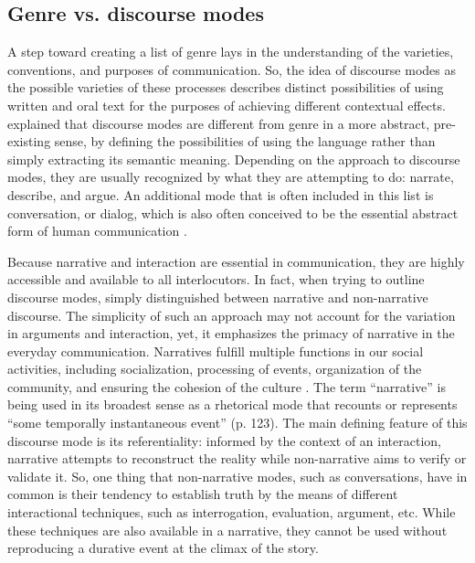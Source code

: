 \documentclass[12pt]{article}
\begin{document}
\subsection{Genre vs. discourse modes}
A step toward creating a list of genre lays in the understanding of the varieties, conventions, and purposes of communication. So, the idea of discourse modes as the possible varieties of these processes describes distinct possibilities of using written and oral text for the purposes of achieving different contextual effects. \textcite[p. 54]{bax2011} explained that discourse modes are different from genre in a more abstract, pre-existing sense, by defining the possibilities of using the language rather than simply extracting its semantic meaning. Depending on the approach to discourse modes, they are usually recognized by what they are attempting to do: narrate, describe, and argue. An additional mode that is often included in this list is conversation, or dialog, which is also often conceived to be the essential abstract form of human communication \parencite{bakhtin1986, bax2011}. 

Because narrative and interaction are  essential in communication, they are highly accessible and available to all interlocutors.  In fact, when trying to outline discourse modes, \textcite{georgakopoulou2000} simply distinguished between narrative and non-narrative discourse. The simplicity of such an approach may not account for the variation in arguments and interaction, yet, it emphasizes the primacy of narrative in the everyday communication. Narratives fulfill multiple functions in our social activities, including socialization, processing of events, organization of the community, and ensuring the cohesion of the culture \parencite{georgakopoulou2000}. The term ``narrative'' is being used in its broadest sense as a rhetorical mode that recounts or represents ``some temporally instantaneous event'' (p. 123). The main defining feature of this discourse mode is its referentiality: informed by the context of an interaction, narrative attempts to reconstruct the reality while non-narrative aims to verify or validate it. So, one thing that non-narrative modes, such as conversations, have in common is their tendency to establish truth by the means of different interactional techniques, such as interrogation, evaluation, argument, etc. While these techniques are also available in a narrative, they cannot be used without reproducing a durative event at the climax of the story. 
\end{document}
